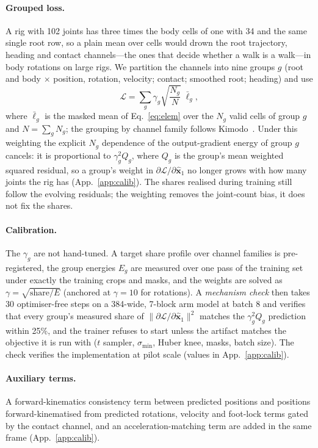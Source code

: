 \paragraph{Grouped loss.} A rig with 102 joints has three times the body cells of one with 34 and
the same single root row, so a plain mean over cells would drown the root trajectory, heading and
contact channels---the ones that decide whether a walk is a walk---in body rotations on large rigs.
We partition the channels into nine groups $g$ (root and body $\times$ position, rotation, velocity;
contact; smoothed root; heading) and use
\begin{equation}
  \mathcal{L}=\sum_{g}\gamma_g\sqrt{\frac{N_g}{N}}\;\bar{\ell}_g,
  \label{eq:grouped}
\end{equation}
where $\bar{\ell}_g$ is the masked mean of Eq.~\eqref{eq:elem} over the $N_g$ valid cells of group
$g$ and $N=\sum_g N_g$; the grouping by channel family follows Kimodo~\citep{rempe2026kimodo}.
Under this weighting the explicit $N_g$ dependence of the output-gradient energy of group $g$
cancels: it is proportional to $\gamma_g^{2}Q_g$, where $Q_g$ is the group's mean weighted squared
residual, so a group's weight in $\partial\mathcal{L}/\partial\hat{\mathbf{x}}_1$ no longer grows
with how many joints the rig has (App.~\ref{app:calib}). The shares realised during
training still follow the evolving residuals; the weighting removes the joint-count bias, it does not
fix the shares.

\paragraph{Calibration.} The $\gamma_g$ are not hand-tuned. A target share profile over channel
families is pre-registered, the group energies $E_g$ are measured over one pass of the training set
under exactly the training crops and masks, and the weights are solved as
$\gamma=\sqrt{\text{share}/E}$ (anchored at $\gamma{=}10$ for rotations). A \emph{mechanism check}
then takes 30 optimiser-free steps on a 384-wide, 7-block arm model at batch 8 and verifies that every group's measured share
of $\|\partial\mathcal{L}/\partial\hat{\mathbf{x}}_1\|^{2}$ matches the $\gamma_g^{2}Q_g$
prediction within 25\%, and the trainer refuses to start unless the artifact matches the objective
it is run with ($t$ sampler, $\sigma_{\min}$, Huber knee, masks, batch size). The check verifies the
implementation at pilot scale (values in App.~\ref{app:calib}).

\paragraph{Auxiliary terms.} A forward-kinematics consistency term between predicted positions and
positions forward-kinematised from predicted rotations, velocity and foot-lock terms gated by the
contact channel, and an acceleration-matching term are added in the same frame (App.~\ref{app:calib}).

